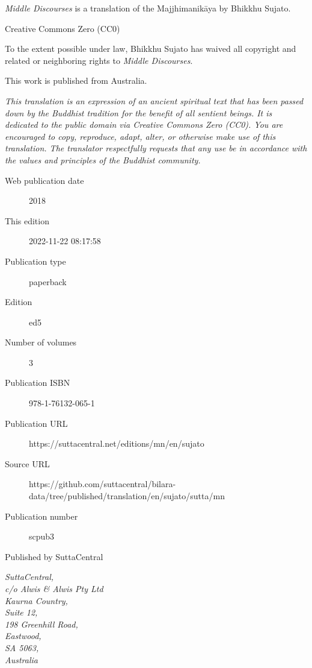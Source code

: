 \documentclass[12pt,openany]{book}%
\begin{document}
\begin{footnotesize}

\textit{Middle Discourses} is a translation of the Majjhimanikāya by Bhikkhu Sujato.

\medskip

Creative Commons Zero (CC0)

To the extent possible under law, Bhikkhu Sujato has waived all copyright and related or neighboring rights to \textit{Middle Discourses}.

\medskip

This work is published from Australia.

\begin{center}
\textit{This translation is an expression of an ancient spiritual text that has been passed down by the Buddhist tradition for the benefit of all sentient beings. It is dedicated to the public domain via Creative Commons Zero (CC0). You are encouraged to copy, reproduce, adapt, alter, or otherwise make use of this translation. The translator respectfully requests that any use be in accordance with the values and principles of the Buddhist community.}
\end{center}

\medskip

\begin{description}
    \item[Web publication date] 2018
    \item[This edition] 2022-11-22 08:17:58
    \item[Publication type] paperback
    \item[Edition] ed5
    \item[Number of volumes] 3
    \item[Publication ISBN] 978-1-76132-065-1
    \item[Publication URL] https://suttacentral.net/editions/mn/en/sujato
    \item[Source URL] https://github.com/suttacentral/bilara-data/tree/published/translation/en/sujato/sutta/mn
    \item[Publication number] scpub3
\end{description}

\medskip

Published by SuttaCentral

\medskip

\textit{SuttaCentral,\\
c/o Alwis \& Alwis Pty Ltd\\
Kaurna Country,\\
Suite 12,\\
198 Greenhill Road,\\
Eastwood,\\
SA 5063,\\
Australia}

\end{footnotesize}
\end{document}
